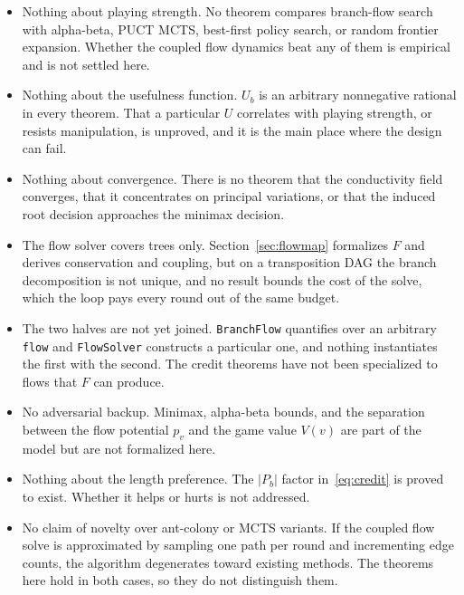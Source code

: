 \documentclass[11pt,a4paper]{article}
\theoremstyle{definition}
\newcommand{\lean}[1]{\texttt{#1}}
\begin{document}
\begin{itemize}[leftmargin=1.4em]
  \item Nothing about playing strength. No theorem compares branch-flow search
  with alpha-beta, PUCT MCTS, best-first policy search, or random frontier
  expansion. Whether the coupled flow dynamics beat any of them is empirical
  and is not settled here.

  \item Nothing about the usefulness function. $U_b$ is an arbitrary
  nonnegative rational in every theorem. That a particular $U$ correlates with
  playing strength, or resists manipulation, is unproved, and it is the main
  place where the design can fail.

  \item Nothing about convergence. There is no theorem that the conductivity
  field converges, that it concentrates on principal variations, or that the
  induced root decision approaches the minimax decision.

  \item The flow solver covers trees only. Section~\ref{sec:flowmap}
  formalizes $F$ and derives conservation and coupling, but on a transposition
  DAG the branch decomposition is not unique, and no result bounds the cost of
  the solve, which the loop pays every round out of the same budget.

  \item The two halves are not yet joined. \lean{BranchFlow} quantifies over an
  arbitrary \lean{flow} and \lean{FlowSolver} constructs a particular one, and
  nothing instantiates the first with the second. The credit theorems have not
  been specialized to flows that $F$ can produce.

  \item No adversarial backup. Minimax, alpha-beta bounds, and the separation
  between the flow potential $p_v$ and the game value $V(v)$ are part of the
  model but are not formalized here.

  \item Nothing about the length preference. The $|P_b|$ factor
  in~\eqref{eq:credit} is proved to exist. Whether it helps or hurts is not
  addressed.

  \item No claim of novelty over ant-colony or MCTS variants. If the coupled
  flow solve is approximated by sampling one path per round and incrementing
  edge counts, the algorithm degenerates toward existing methods. The theorems
  here hold in both cases, so they do not distinguish them.
\end{itemize}
\end{document}
